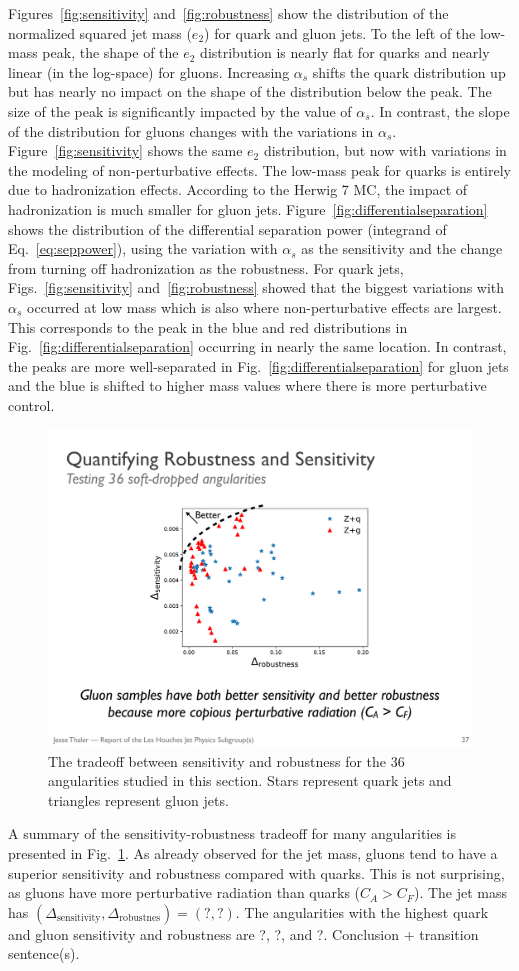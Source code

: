 Figures~\ref{fig:sensitivity} and~\ref{fig:robustness} show the distribution of the normalized squared jet mass ($e_2$) for quark and gluon jets.  To the left of the low-mass peak, the shape of the $e_2$ distribution is nearly flat for quarks and nearly linear (in the log-space) for gluons.  Increasing $\alpha_s$ shifts the quark distribution up but has nearly no impact on the shape of the distribution below the peak.  The size of the peak is significantly impacted by the value of $\alpha_s$.  In contrast, the slope of the distribution for gluons changes with the variations in $\alpha_s$.  Figure~\ref{fig:sensitivity} shows the same $e_2$ distribution, but now with variations in the modeling of non-perturbative effects.  The low-mass peak for quarks is entirely due to hadronization effects.  According to the Herwig 7 MC, the impact of hadronization is much smaller for gluon jets.  Figure~\ref{fig:differentialseparation} shows the distribution of the differential separation power (integrand of Eq.~\ref{eq:seppower}), using the variation with $\alpha_s$ as the sensitivity and the change from turning off hadronization as the robustness.  For quark jets, Figs.~\ref{fig:sensitivity} and~\ref{fig:robustness} showed that the biggest variations with $\alpha_s$ occurred at low mass which is also where non-perturbative effects are largest.  This corresponds to the peak in the blue and red distributions in Fig.~\ref{fig:differentialseparation} occurring in nearly the same location.  In contrast, the peaks are more well-separated in Fig.~\ref{fig:differentialseparation} for gluon jets and the blue is shifted to higher mass values where there is more perturbative control.  

\begin{figure}[h!]
\begin{center}
\includegraphics[width = 0.6\columnwidth]{figures/robseptradeoff.pdf}
\end{center}
\caption{The tradeoff between sensitivity and robustness for the 36 angularities studied in this section.  Stars represent quark jets and triangles represent gluon jets.}
\label{fig:robseptradeoff}
\end{figure}

A summary of the sensitivity-robustness tradeoff for many angularities is presented in Fig.~\ref{fig:robseptradeoff}.  As already observed for the jet mass, gluons tend to have a superior sensitivity and robustness compared with quarks.  This is not surprising, as gluons have more perturbative radiation than quarks ($C_A>C_F$).  The jet mass has $(\Delta_\text{sensitivity},\Delta_\text{robustnes})=(?,?)$.  The angularities with the highest quark and gluon sensitivity and robustness are ?, ?, and ?.   Conclusion + transition sentence(s).
